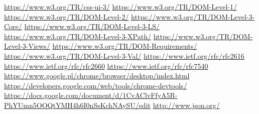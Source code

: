 \documentclass[polish, twoside, 12pt]{mwart}
\begin{document}
\begin{thebibliography}{11}
    \url{https://www.w3.org/TR/css-ui-3/}
    \url{https://www.w3.org/TR/DOM-Level-1/}
    \url{https://www.w3.org/TR/DOM-Level-2/}
    \url{https://www.w3.org/TR/DOM-Level-3-Core/}
    \url{https://www.w3.org/TR/DOM-Level-3-LS/}
    \url{https://www.w3.org/TR/DOM-Level-3-XPath/}
    \url{https://www.w3.org/TR/DOM-Level-3-Views/}
    \url{https://www.w3.org/TR/DOM-Requirements/}
    \url{https://www.w3.org/TR/DOM-Level-3-Val/}
    \url{https://www.ietf.org/rfc/rfc2616}
    \url{https://www.ietf.org/rfc/rfc2660}
    \url{https://www.ietf.org/rfc/rfc7540}
    \url{https://www.google.pl/chrome/browser/desktop/index.html}
    \url{https://developers.google.com/web/tools/chrome-devtools/}
    \url{https://docs.google.com/document/d/1CvAClvFfyA5R-PhYUmn5OOQtYMH4h6I0nSsKchNAySU/edit}
    \url{http://www.json.org/}
\end{thebibliography}
\end{document}
